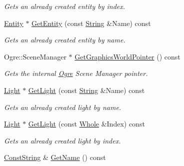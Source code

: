 \begin{DoxyCompactItemize}
\begin{DoxyCompactList}\small\item\em Gets an already created entity by index. \item\end{DoxyCompactList}\item 
\hyperlink{classMezzanine_1_1Entity}{Entity} $\ast$ \hyperlink{classMezzanine_1_1SceneManager_a7701c34c00ff4de64e81249953178003}{GetEntity} (const \hyperlink{namespaceMezzanine_acf9fcc130e6ebf08e3d8491aebcf1c86}{String} \&Name) const 
\begin{DoxyCompactList}\small\item\em Gets an already created entity by name. \item\end{DoxyCompactList}\item 
Ogre::SceneManager $\ast$ \hyperlink{classMezzanine_1_1SceneManager_a3156d3ec1b514e295368bfa4b94d4adc}{GetGraphicsWorldPointer} () const 
\begin{DoxyCompactList}\small\item\em Gets the internal \hyperlink{namespaceOgre}{Ogre} Scene Manager pointer. \item\end{DoxyCompactList}\item 
\hyperlink{classMezzanine_1_1Light}{Light} $\ast$ \hyperlink{classMezzanine_1_1SceneManager_ad28337e68dac694721cbb798dedd151f}{GetLight} (const \hyperlink{namespaceMezzanine_acf9fcc130e6ebf08e3d8491aebcf1c86}{String} \&Name) const 
\begin{DoxyCompactList}\small\item\em Gets an already created light by name. \item\end{DoxyCompactList}\item 
\hyperlink{classMezzanine_1_1Light}{Light} $\ast$ \hyperlink{classMezzanine_1_1SceneManager_a38b93841cb86bd2cb9cf4b7431946f8e}{GetLight} (const \hyperlink{namespaceMezzanine_adcbb6ce6d1eb4379d109e51171e2e493}{Whole} \&Index) const 
\begin{DoxyCompactList}\small\item\em Gets an already created light by index. \item\end{DoxyCompactList}\item 
\hyperlink{namespaceMezzanine_a63cd699ac54b73953f35ec9cfc05e506}{ConstString} \& \hyperlink{classMezzanine_1_1SceneManager_ae28b426f75094bad85a2e4c737e2719f}{GetName} () const 

\end{DoxyCompactItemize}
